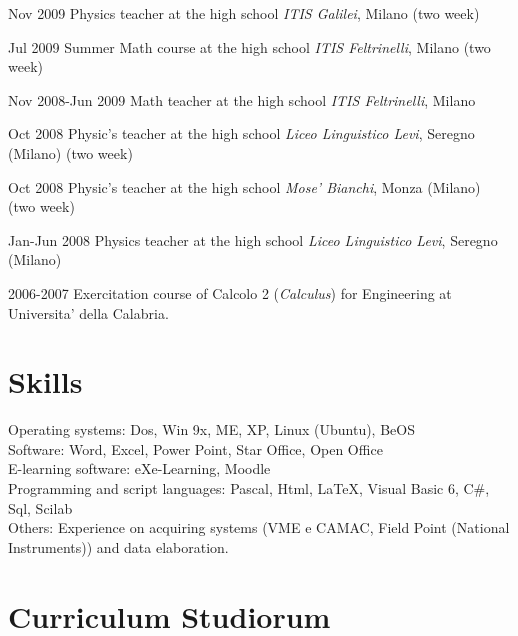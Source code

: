\begin{CV}
\item[Nov 2009] Physics teacher at the high school {\em ITIS Galilei}, Milano (two week)

\item[Jul 2009] Summer Math course at the high school {\em ITIS Feltrinelli}, Milano (two week)

\item[Nov 2008-Jun 2009] Math teacher at the high school {\em ITIS Feltrinelli}, Milano

\item[Oct 2008] Physic's teacher at the high school {\em Liceo Linguistico Levi}, Seregno (Milano) (two week)

\item[Oct 2008] Physic's teacher at the high school {\em Mose' Bianchi}, Monza (Milano) (two week)

\item[Jan-Jun 2008] Physics teacher at the high school {\em Liceo Linguistico Levi}, Seregno (Milano)

\item[2006-2007] Exercitation course of Calcolo 2 ({\em Calculus}) for Engineering at Universita' della Calabria.

\end{CV}

\section{Skills}

Operating systems: Dos, Win 9x, ME, XP, Linux (Ubuntu), BeOS\\
Software: Word, Excel, Power Point, Star Office, Open Office\\
E-learning software: eXe-Learning, Moodle\\
Programming and script languages: Pascal, Html, \LaTeX, Visual Basic 6, C\#, Sql, Scilab\\
Others: Experience on acquiring systems (VME e CAMAC, Field Point (National Instruments)) and data elaboration.

\section{Curriculum Studiorum}

